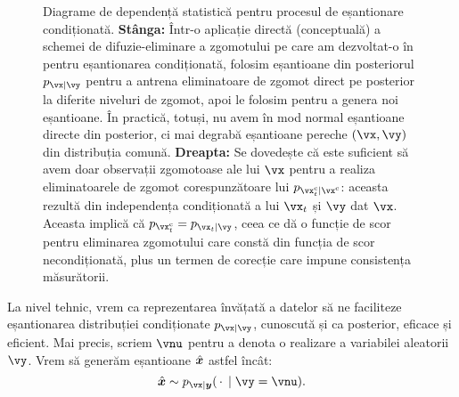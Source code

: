 \documentclass[../../book-main_ro.tex]{subfiles}
\begin{document}
\begin{figure}[t]
  \centering
  \begin{subfigure}{0.45\textwidth}
    \vspace{0.75cm}
    \centering
    \vspace{0.75cm}
    \caption{}
    \label{fig:left}
  \end{subfigure}
  \hfill
  \begin{subfigure}{0.45\textwidth}
    \centering
    \caption{}
    \label{fig:right}
  \end{subfigure}
  \caption{Diagrame de dependență statistică pentru procesul de eșantionare condiționată.
  \textbf{Stânga:} Într-o aplicație directă (conceptuală) a schemei de difuzie-eliminare a zgomotului
  pe care am dezvoltat-o în  pentru eșantionarea condiționată, folosim
  eșantioane din posteriorul $p_{\vx \mid \vy}$ pentru a antrena eliminatoare de zgomot direct pe
  posterior la diferite niveluri de zgomot, apoi le folosim pentru a genera noi
  eșantioane. În practică, totuși, nu avem în mod normal eșantioane directe din
  posterior, ci mai degrabă eșantioane pereche $(\vx, \vy)$ din distribuția comună.
  \textbf{Dreapta:} Se dovedește că este suficient să avem doar observații zgomotoase
  ale lui $\vx$ pentru a realiza eliminatoarele de zgomot corespunzătoare lui $p_{\posteriorsample_t \mid
  \posteriorsample}$: aceasta rezultă din independența condiționată a lui $\vx_t$ și
  $\vy$ dat $\vx$. Aceasta implică că $p_{\posteriorsample_t} = p_{\vx_t \mid
  \vy}$, ceea ce dă o funcție de scor pentru eliminarea zgomotului care constă din
  funcția de scor necondiționată, plus un termen de corecție care impune
  consistența măsurătorii.}
  \label{fig:posterior-sampling-cds}
\end{figure}


La nivel tehnic, vrem ca reprezentarea învățată a datelor
să ne faciliteze eșantionarea distribuției condiționate $p_{\vx\mid
\vy}$, cunoscută și ca posterior, eficace și eficient. Mai precis,
scriem $\vnu$ pentru a denota o realizare a variabilei aleatorii $\vy$.
Vrem să generăm eșantioane $\hat{\bm{x}}$ astfel încât:
\begin{equation}\label{eq:goal-sample-posterior}
  \hat{\x} \sim   p_{\vx \mid \y}(\spcdot \mid \vy=\vnu).
\end{equation}
\end{document}
